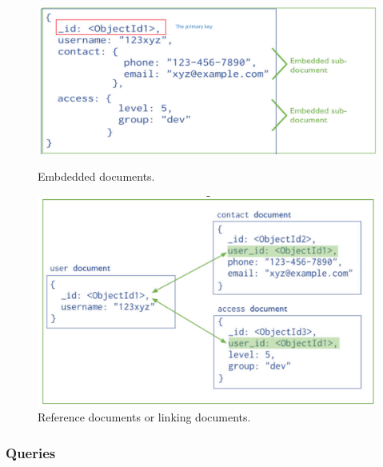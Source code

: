 \documentclass[10pt,a4paper]{article}
\begin{document}
\begin{figure}[ht!]
\centering
\begin{minipage}{.5\textwidth}
  \centering
  \includegraphics[width=.8\linewidth]{images/mongodb-embedded}
    \caption{Embdedded documents.}
\end{minipage}%
\begin{minipage}{.5\textwidth}
  \centering
  \includegraphics[width=.8\linewidth]{images/mongodb-reference}
  \caption{Reference documents or linking documents.}
\end{minipage}
\end{figure} 
\subsubsection{Queries}
\end{document}
